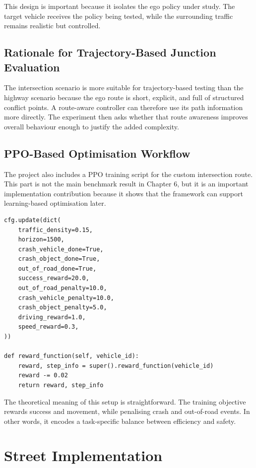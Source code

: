 \documentclass[12pt,a4paper]{report}
\begin{document}
This design is important because it isolates the ego policy under study. The target vehicle receives the policy being tested, while the surrounding traffic remains realistic but controlled.

\subsection{Rationale for Trajectory-Based Junction Evaluation}
The intersection scenario is more suitable for trajectory-based testing than the highway scenario because the ego route is short, explicit, and full of structured conflict points. A route-aware controller can therefore use its path information more directly. The experiment then asks whether that route awareness improves overall behaviour enough to justify the added complexity.

\subsection{PPO-Based Optimisation Workflow}
The project also includes a PPO training script for the custom intersection route. This part is not the main benchmark result in Chapter 6, but it is an important implementation contribution because it shows that the framework can support learning-based optimisation later.

\begin{lstlisting}[caption={Main reward and configuration logic for the PPO training workflow.},label={lst:ppo_logic},float=H]
cfg.update(dict(
    traffic_density=0.15,
    horizon=1500,
    crash_vehicle_done=True,
    crash_object_done=True,
    out_of_road_done=True,
    success_reward=20.0,
    out_of_road_penalty=10.0,
    crash_vehicle_penalty=10.0,
    crash_object_penalty=5.0,
    driving_reward=1.0,
    speed_reward=0.3,
))

def reward_function(self, vehicle_id):
    reward, step_info = super().reward_function(vehicle_id)
    reward -= 0.02
    return reward, step_info
\end{lstlisting}

The theoretical meaning of this setup is straightforward. The training objective rewards success and movement, while penalising crash and out-of-road events. In other words, it encodes a task-specific balance between efficiency and safety.

\section{Street Implementation}
\end{document}
